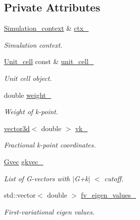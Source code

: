 \subsection*{Private Attributes}
\begin{DoxyCompactItemize}
\item 
\hyperlink{classsirius_1_1_simulation__context}{Simulation\+\_\+context} \& \hyperlink{classsirius_1_1_k__point_a27a93d5256b4cc87a63431d3ed765573}{ctx\+\_\+}
\begin{DoxyCompactList}\small\item\em Simulation context. \end{DoxyCompactList}\item 
\hyperlink{classsirius_1_1_unit__cell}{Unit\+\_\+cell} const \& \hyperlink{classsirius_1_1_k__point_aa67d12ebc672e0b301abe37761beb732}{unit\+\_\+cell\+\_\+}
\begin{DoxyCompactList}\small\item\em Unit cell object. \end{DoxyCompactList}\item 
double \hyperlink{classsirius_1_1_k__point_ab3965c7b91f584168bf92d4d59dd0fc4}{weight\+\_\+}
\begin{DoxyCompactList}\small\item\em Weight of k-\/point. \end{DoxyCompactList}\item 
\hyperlink{classgeometry3d_1_1vector3d}{vector3d}$<$ double $>$ \hyperlink{classsirius_1_1_k__point_a7d2852ebbede1528de4b8464f9ab1a7a}{vk\+\_\+}
\begin{DoxyCompactList}\small\item\em Fractional k-\/point coordinates. \end{DoxyCompactList}\item 
\hyperlink{classsddk_1_1_gvec}{Gvec} \hyperlink{classsirius_1_1_k__point_aa35c8c7b4c50603dcdd68267a0f5214f}{gkvec\+\_\+}
\begin{DoxyCompactList}\small\item\em List of G-\/vectors with $\vert$\+G+k$\vert$ $<$ cutoff. \end{DoxyCompactList}\item 
std\+::vector$<$ double $>$ \hyperlink{classsirius_1_1_k__point_a14dcb7159c34100962ccbe6f56a5a195}{fv\+\_\+eigen\+\_\+values\+\_\+}
\begin{DoxyCompactList}\small\item\em First-\/variational eigen values. \end{DoxyCompactList}\item 

\end{DoxyCompactItemize}
